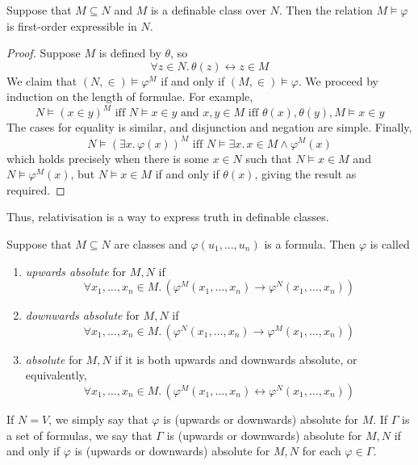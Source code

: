 \begin{proposition}
    Suppose that \( M \subseteq N \) and \( M \) is a definable class over \( N \).
    Then the relation \( M \vDash \varphi \) is first-order expressible in \( N \).
\end{proposition}
\begin{proof}
    Suppose \( M \) is defined by \( \theta \), so
    \[ \forall z \in N.\, \theta(z) \leftrightarrow z \in M \]
    We claim that \( (N, \in) \vDash \varphi^M \) if and only if \( (M, \in) \vDash \varphi \).
    We proceed by induction on the length of formulae.
    For example,
    \[ N \vDash (x \in y)^M \text{ iff } N \vDash x \in y \text{ and } x, y \in M \text{ iff } \theta(x), \theta(y), M \vDash x \in y \]
    The cases for equality is similar, and disjunction and negation are simple.
    Finally,
    \[ N \vDash (\exists x.\, \varphi(x))^M \text{ iff } N \vDash \exists x.\, x \in M \wedge \varphi^M(x) \]
    which holds precisely when there is some \( x \in N \) such that \( N \vDash x \in M \) and \( N \vDash \varphi^M(x) \), but \( N \vDash x \in M \) if and only if \( \theta(x) \), giving the result as required.
\end{proof}
Thus, relativisation is a way to express truth in definable classes.
\begin{definition}
    Suppose that \( M \subseteq N \) are classes and \( \varphi(u_1, \dots, u_n) \) is a formula.
    Then \( \varphi \) is called
    \begin{enumerate}
        \item \emph{upwards absolute} for \( M, N \) if
        \[ \forall x_1, \dots, x_n \in M.\, (\varphi^M(x_1, \dots, x_n) \to \varphi^N(x_1, \dots, x_n)) \]
        \item \emph{downwards absolute} for \( M, N \) if
        \[ \forall x_1, \dots, x_n \in M.\, (\varphi^N(x_1, \dots, x_n) \to \varphi^M(x_1, \dots, x_n)) \]
        \item \emph{absolute} for \( M, N \) if it is both upwards and downwards absolute, or equivalently,
        \[ \forall x_1, \dots, x_n \in M.\, (\varphi^M(x_1, \dots, x_n) \leftrightarrow \varphi^N(x_1, \dots, x_n)) \]
    \end{enumerate}
\end{definition}
If \( N = V \), we simply say that \( \varphi \) is (upwards or downwards) absolute for \( M \).
If \( \Gamma \) is a set of formulas, we say that \( \Gamma \) is (upwards or downwards) absolute for \( M, N \) if and only if \( \varphi \) is (upwards or downwards) absolute for \( M, N \) for each \( \varphi \in \Gamma \).
